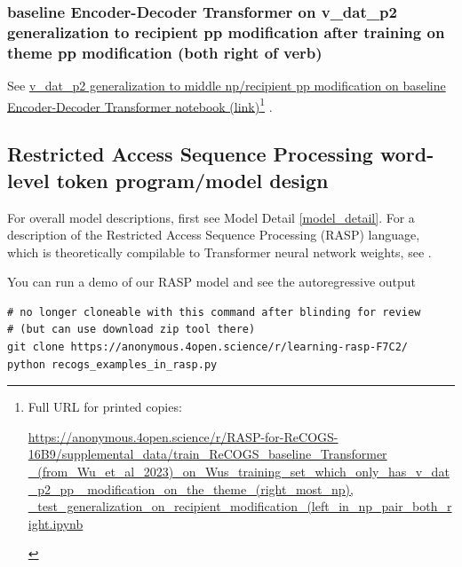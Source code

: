 \documentclass[11pt]{article}
\begin{document}
\subsubsection{\cite{Wu2023} baseline Encoder-Decoder Transformer on v\_dat\_p2 generalization to recipient pp modification after training on theme pp modification (both right of verb)}


See \href{https://anonymous.4open.science/r/RASP-for-ReCOGS-16B9/supplemental\_data/train\_ReCOGS\_baseline\_Transformer\_(from\_Wu\_et\_al\_2023)\_on\_Wus\_training\_set\_which\_only\_has\_v\_dat\_p2\_pp\_modification\_on\_the\_theme\_(right\_most\_np),\_test\_generalization\_on\_recipient\_modification\_(left\_in\_np\_pair\_both\_right.ipynb}{v\_dat\_p2 generalization to middle np/recipient pp modification on baseline Encoder-Decoder Transformer notebook (link)}\footnote{\begin{footnotesize}Full URL for printed copies: 

\href{https://anonymous.4open.science/r/RASP-for-ReCOGS-16B9/supplemental\_data/train\_ReCOGS\_baseline\_Transformer\_(from\_Wu\_et\_al\_2023)\_on\_Wus\_training\_set\_which\_only\_has\_v\_dat\_p2\_pp\_modification\_on\_the\_theme\_(right\_most\_np),\_test\_generalization\_on\_recipient\_modification\_(left\_in\_np\_pair\_both\_right.ipynb}{https://anonymous.4open.science/r/RASP-for-ReCOGS-16B9/supplemental\_data/train\_ReCOGS\_baseline\_Transformer
\_(from\_Wu\_et\_al\_2023)\_on\_Wus\_training\_set\_which\_only\_has\_v\_dat\_p2\_pp
\_modification\_on\_the\_theme\_(right\_most\_np),
\_test\_generalization\_on\_recipient\_modification\_(left\_in\_np\_pair\_both\_right.ipynb}
\end{footnotesize}} .

\twocolumn
\clearpage

\subsection{Restricted Access Sequence Processing word-level token program/model design}
\label{rasp-word-level-model-design}

For overall model descriptions, first see Model Detail \ref{model_detail}.
For a description of the Restricted Access Sequence Processing (RASP) language, which is theoretically compilable to Transformer neural network weights, see \cite{Weiss2021}.

You can run a demo of our RASP model and see the autoregressive output 

\begin{tiny}
\begin{verbatim}
# no longer cloneable with this command after blinding for review
# (but can use download zip tool there)
git clone https://anonymous.4open.science/r/learning-rasp-F7C2/
python recogs_examples_in_rasp.py 
\end{verbatim}
\end{tiny}
\end{document}
